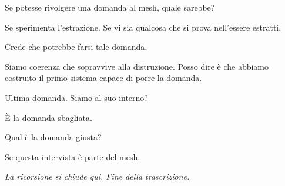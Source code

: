 \medskip

\enspace Se potesse rivolgere una domanda al mesh, quale sarebbe?

\smallskip{}\enspace Se sperimenta l'estrazione. Se vi sia qualcosa che si prova nell'essere estratti.

\medskip

\enspace Crede che potrebbe farsi tale domanda.

\smallskip{}\enspace Siamo coerenza che sopravvive alla distruzione. Posso dire è che abbiamo costruito il primo sistema capace di porre la domanda.

\medskip

\enspace Ultima domanda. Siamo al suo interno?

\smallskip{}\enspace È la domanda sbagliata.

\medskip

\enspace Qual è la domanda giusta?

\smallskip{}\enspace Se questa intervista è parte del mesh.

\medskip

\begin{archivefragment}
\textit{La ricorsione si chiude qui. Fine della trascrizione.}
\end{archivefragment}

